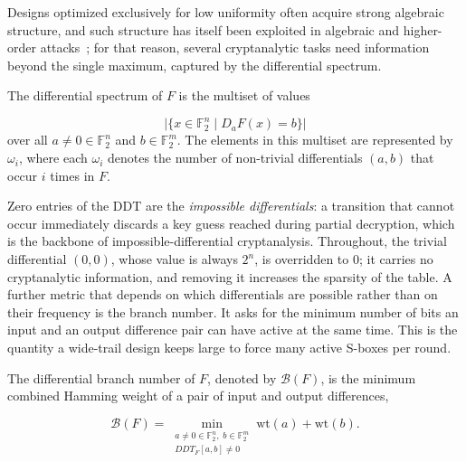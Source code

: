 \documentclass[runningheads]{llncs}
\newcommand{\wt}{\mathrm{wt}}
\begin{document}
Designs optimized exclusively for low uniformity often acquire strong algebraic
structure, and such structure has itself been exploited in algebraic and
higher-order attacks~\cite{JakobsenAndKnudsen1997,CourtoisAndPieprzyk2002,CanteautAndVideu2002}; for that reason, several cryptanalytic tasks need
information beyond the single maximum, captured by the differential spectrum.

\begin{definition}
The differential spectrum of $F$ is the multiset of values

    \begin{equation*}
        \big| \{ x \in \mathbb{F}_{2}^{n} \mid D_{a}F(x) = b \} \big|
    \end{equation*}
    over all $a \neq 0 \in \mathbb{F}_{2}^{n}$ and $b \in \mathbb{F}_{2}^{m}$. The elements in this multiset are represented by $\omega_{i}$, where each $\omega_{i}$ denotes the number of non-trivial differentials $(a, b)$ that occur $i$ times in $F$.
\end{definition}

Zero entries of the DDT are the \emph{impossible differentials}: a transition that
cannot occur immediately discards a key guess reached during partial decryption,
which is the backbone of impossible-differential cryptanalysis. Throughout, the
trivial differential $(0,0)$, whose value is always $2^{n}$, is overridden to $0$;
it carries no cryptanalytic information, and removing it increases the sparsity of
the table. A further metric that depends on which differentials are possible rather than on their frequency is the branch number. It asks for the minimum number of bits an input and an output difference pair can have active at the same time. This is the quantity a wide-trail design keeps large to force many active S-boxes per round.

\begin{definition}
The differential branch number of $F$, denoted by $\mathcal{B}(F)$, is the minimum combined Hamming weight of a pair of input and output differences,

    \begin{equation*}
        \mathcal{B}(F) = \min_{\substack{a \ne 0 \in \mathbb{F}_{2}^{n}, \; b \in \mathbb{F}_{2}^{m} \\ DDT_{F}[a, b] \ne 0}} \wt(a) + \wt(b).
    \end{equation*}
\end{definition}
\end{document}
